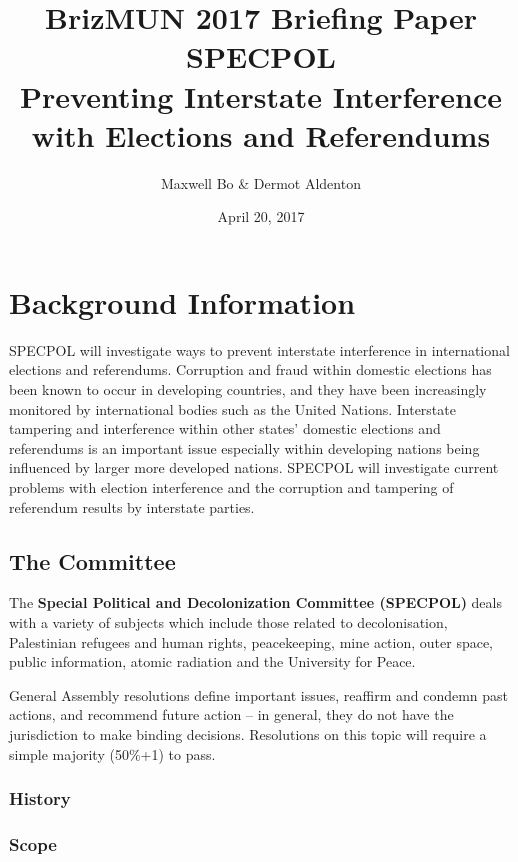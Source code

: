 \documentclass[11pt,a4paper]{report}
\begin{document}
\title{BrizMUN 2017 Briefing Paper \\ SPECPOL \\ Preventing Interstate Interference with Elections and Referendums}
\author{Maxwell Bo \& Dermot Aldenton}
\date{April 20, 2017}
\maketitle


\section{Background Information}

SPECPOL will investigate ways to prevent interstate interference in international elections and referendums. Corruption and fraud within domestic elections has been known to occur in developing countries, and they have been increasingly monitored by international bodies such as the United Nations. Interstate tampering and interference within other states’ domestic elections and referendums is an important issue especially within developing nations being influenced by larger more developed nations. SPECPOL will investigate current problems with election interference and the corruption and tampering of referendum results by interstate parties.

\subsection{The Committee}

The \textbf{Special Political and Decolonization Committee (SPECPOL)} deals with a variety of subjects which include those related to decolonisation, Palestinian refugees and human rights, peacekeeping, mine action, outer space, public information, atomic radiation and the University for Peace. 

General Assembly resolutions define important issues, reaffirm and condemn past actions, and recommend future action – in general, they do not have the jurisdiction to make binding decisions. Resolutions on this topic will require a simple majority (50\%+1) to pass.

\subsubsection{History}
\subsubsection{Scope}
\end{document}
